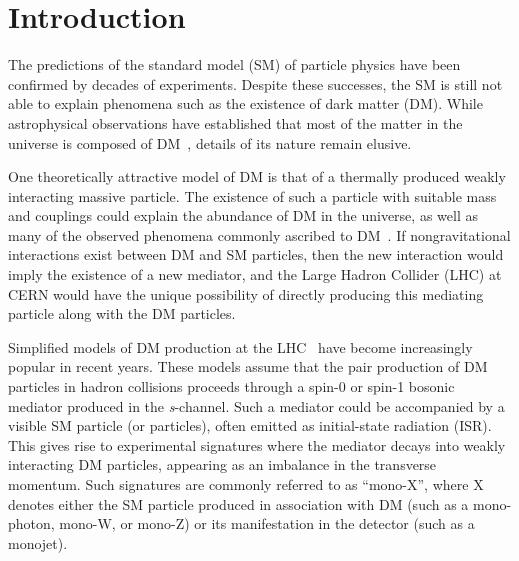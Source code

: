 
\maketitle 

\section{Introduction}
\label{intro}

The predictions of the standard model (SM) of particle physics have been confirmed by decades of experiments. Despite these successes, the SM is still not able to explain phenomena such as the existence of dark matter (DM). While astrophysical observations have established that most of the matter in the universe is composed of DM~\cite{Arkani_Hamed_2009, 1937ApJ}, details of its nature remain elusive. 

One theoretically attractive model of DM is that of a thermally produced weakly interacting massive particle. The existence of such a particle with suitable mass and couplings could explain the abundance of DM in the universe, as well as many of the observed phenomena commonly ascribed to DM~\cite{Bertone:2004pz}. If nongravitational interactions exist between DM and SM particles, then the new interaction would imply the existence of a new mediator, and the Large Hadron Collider (LHC) at CERN would have the unique possibility of directly producing this mediating particle along with the DM particles.

Simplified models of DM production at the LHC~\cite{Abercrombie_2020} have become increasingly popular in recent years. These models assume that the pair production of DM particles in hadron collisions proceeds through a spin-0 or spin-1 bosonic mediator produced in the \textit{s}-channel. Such a mediator could be accompanied by a visible SM particle (or particles), often emitted as initial-state radiation (ISR). This gives rise to experimental signatures where the mediator decays into weakly interacting DM particles, appearing as an imbalance in the transverse momentum. Such signatures are commonly referred to as ``mono-X'', where X denotes either the SM particle produced in association with DM (such as a mono-photon, mono-W, or mono-Z) or its manifestation in the detector (such as a monojet). 


